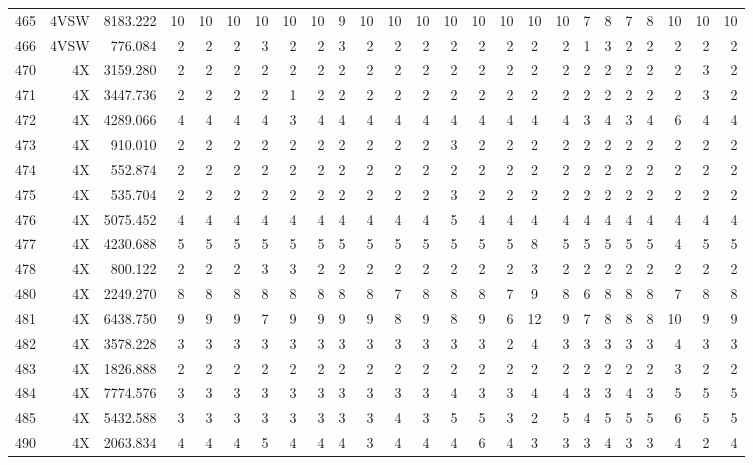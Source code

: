\documentclass[12pt]{article}\usepackage[]{graphicx}\usepackage[]{color}
\begin{document}
\begin{landscape}
\begin{longtable}[t]{crrrrrrrrrrrrrrrcrrrrrrrr}
465 & 4VSW & 8183.222 & 10 & 10 & 10 & 10 & 10 & 10 & 9 & 10 & 10 & 10 & 10 & 10 & 10 & 10 & 10 & 7 & 8 & 7 & 8 & 10 & 10 & 10\\
466 & 4VSW & 776.084 & 2 & 2 & 2 & 3 & 2 & 2 & 3 & 2 & 2 & 2 & 2 & 2 & 2 & 2 & 2 & 1 & 3 & 2 & 2 & 2 & 2 & 2\\
470 & 4X & 3159.280 & 2 & 2 & 2 & 2 & 2 & 2 & 2 & 2 & 2 & 2 & 2 & 2 & 2 & 2 & 2 & 2 & 2 & 2 & 2 & 2 & 3 & 2\\
471 & 4X & 3447.736 & 2 & 2 & 2 & 2 & 1 & 2 & 2 & 2 & 2 & 2 & 2 & 2 & 2 & 2 & 2 & 2 & 2 & 2 & 2 & 2 & 3 & 2\\
472 & 4X & 4289.066 & 4 & 4 & 4 & 4 & 3 & 4 & 4 & 4 & 4 & 4 & 4 & 4 & 4 & 4 & 4 & 3 & 4 & 3 & 4 & 6 & 4 & 4\\
473 & 4X & 910.010 & 2 & 2 & 2 & 2 & 2 & 2 & 2 & 2 & 2 & 2 & 3 & 2 & 2 & 2 & 2 & 2 & 2 & 2 & 2 & 2 & 2 & 2\\
474 & 4X & 552.874 & 2 & 2 & 2 & 2 & 2 & 2 & 2 & 2 & 2 & 2 & 2 & 2 & 2 & 2 & 2 & 2 & 2 & 2 & 2 & 2 & 2 & 2\\
475 & 4X & 535.704 & 2 & 2 & 2 & 2 & 2 & 2 & 2 & 2 & 2 & 2 & 3 & 2 & 2 & 2 & 2 & 2 & 2 & 2 & 2 & 2 & 2 & 2\\
476 & 4X & 5075.452 & 4 & 4 & 4 & 4 & 4 & 4 & 4 & 4 & 4 & 4 & 5 & 4 & 4 & 4 & 4 & 4 & 4 & 4 & 4 & 4 & 4 & 4\\
477 & 4X & 4230.688 & 5 & 5 & 5 & 5 & 5 & 5 & 5 & 5 & 5 & 5 & 5 & 5 & 5 & 8 & 5 & 5 & 5 & 5 & 5 & 4 & 5 & 5\\
478 & 4X & 800.122 & 2 & 2 & 2 & 3 & 3 & 2 & 2 & 2 & 2 & 2 & 2 & 2 & 2 & 3 & 2 & 2 & 2 & 2 & 2 & 2 & 2 & 2\\
480 & 4X & 2249.270 & 8 & 8 & 8 & 8 & 8 & 8 & 8 & 8 & 7 & 8 & 8 & 8 & 7 & 9 & 8 & 6 & 8 & 8 & 8 & 7 & 8 & 8\\
481 & 4X & 6438.750 & 9 & 9 & 9 & 7 & 9 & 9 & 9 & 9 & 8 & 9 & 8 & 9 & 6 & 12 & 9 & 7 & 8 & 8 & 8 & 10 & 9 & 9\\
482 & 4X & 3578.228 & 3 & 3 & 3 & 3 & 3 & 3 & 3 & 3 & 3 & 3 & 3 & 3 & 2 & 4 & 3 & 3 & 3 & 3 & 3 & 4 & 3 & 3\\
483 & 4X & 1826.888 & 2 & 2 & 2 & 2 & 2 & 2 & 2 & 2 & 2 & 2 & 2 & 2 & 2 & 2 & 2 & 2 & 2 & 2 & 2 & 3 & 2 & 2\\
484 & 4X & 7774.576 & 3 & 3 & 3 & 3 & 3 & 3 & 3 & 3 & 3 & 3 & 4 & 3 & 3 & 4 & 4 & 3 & 3 & 4 & 3 & 5 & 5 & 5\\
485 & 4X & 5432.588 & 3 & 3 & 3 & 3 & 3 & 3 & 3 & 3 & 4 & 3 & 5 & 5 & 3 & 2 & 5 & 4 & 5 & 5 & 5 & 6 & 5 & 5\\
490 & 4X & 2063.834 & 4 & 4 & 4 & 5 & 4 & 4 & 4 & 3 & 4 & 4 & 4 & 6 & 4 & 3 & 3 & 3 & 4 & 3 & 3 & 4 & 2 & 4\\

\end{longtable}
\end{landscape}
\end{document}
